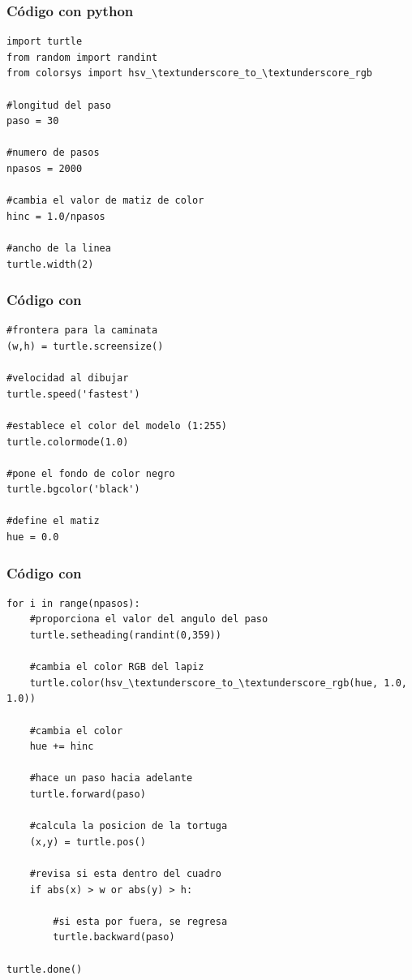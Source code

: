 \documentclass[12pt]{beamer}
\begin{document}
\begin{frame}
\frametitle{Código con python}
\begin{lstlisting}[caption=Definición del espacio de trabajo, style=FormattedNumber, basicstyle=\linespread{1.1}\ttfamily=\small, columns=fullflexible]
import turtle
from random import randint
from colorsys import hsv_\textunderscore_to_\textunderscore_rgb

#longitud del paso
paso = 30

#numero de pasos
npasos = 2000

#cambia el valor de matiz de color
hinc = 1.0/npasos

#ancho de la linea
turtle.width(2)
\end{lstlisting}
\end{frame}
\begin{frame}
\frametitle{Código con \python}
\begin{lstlisting}[caption=Aspecto gráfico del entorno, style=FormattedNumber, basicstyle=\linespread{1.1}\ttfamily=\small, columns=fullflexible]
#frontera para la caminata
(w,h) = turtle.screensize()

#velocidad al dibujar
turtle.speed('fastest')

#establece el color del modelo (1:255)
turtle.colormode(1.0)

#pone el fondo de color negro
turtle.bgcolor('black')

#define el matiz
hue = 0.0
\end{lstlisting}
\end{frame}
\begin{frame}
\frametitle{Código con \python}
\begin{lstlisting}[caption=Definición de pasos y dirección, style=FormattedNumber, basicstyle=\linespread{1.1}\ttfamily=\small, columns=fullflexible]
for i in range(npasos):
	#proporciona el valor del angulo del paso
    turtle.setheading(randint(0,359))
    
    #cambia el color RGB del lapiz
    turtle.color(hsv_\textunderscore_to_\textunderscore_rgb(hue, 1.0, 1.0))
    
    #cambia el color
    hue += hinc
    
    #hace un paso hacia adelante
    turtle.forward(paso)
    
    #calcula la posicion de la tortuga
    (x,y) = turtle.pos()
    
    #revisa si esta dentro del cuadro
    if abs(x) > w or abs(y) > h:
    	
    	#si esta por fuera, se regresa
        turtle.backward(paso)
        
turtle.done()
\end{lstlisting}
\end{frame}
\end{document}
